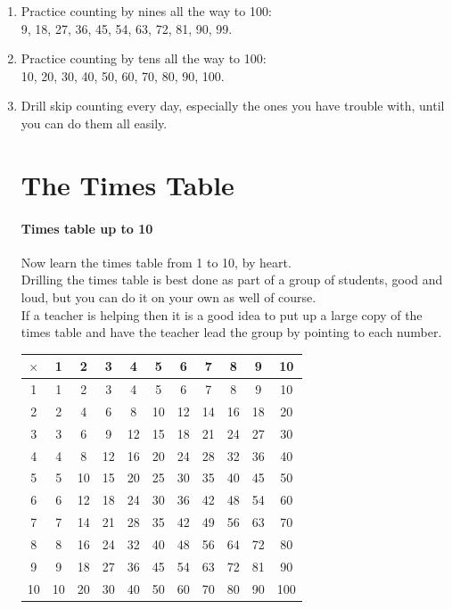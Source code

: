 \documentclass[12pt]{article}
\begin{document}
\begin{enumerate}
\item Practice counting by nines all the way to 100:\\
9, 18, 27, 36, 45, 54, 63, 72, 81, 90, 99.\\

\item Practice counting by tens all the way to 100:\\
10, 20, 30, 40, 50, 60, 70, 80, 90, 100.\\

\item Drill skip counting every day, especially the ones you have trouble with, until you can do them all easily.

\pagebreak

\section*{The Times Table}

\paragraph{Times table up to 10}
Now learn the times table from 1 to 10, by heart.\\

Drilling the times table is best done as part of a group of students, good and loud, but you can do it on your own as well of course.\\

If a teacher is helping then it is a good idea to put up a large copy of the times table and have the teacher lead the group by pointing to each number.\\

\begin{center}
\begin{tabular}{|c||*{10}{c|}}
\hline
$\times$ & 1 & 2 & 3 & 4 & 5 & 6 & 7 & 8 & 9 & 10 \\
\hline\hline
1 & 1 & 2 & 3 & 4 & 5 & 6 & 7 & 8 & 9 & 10 \\
2 & 2 & 4 & 6 & 8 & 10 & 12 & 14 & 16 & 18 & 20 \\
3 & 3 & 6 & 9 & 12 & 15 & 18 & 21 & 24 & 27 & 30 \\
4 & 4 & 8 & 12 & 16 & 20 & 24 & 28 & 32 & 36 & 40 \\
5 & 5 & 10 & 15 & 20 & 25 & 30 & 35 & 40 & 45 & 50 \\
6 & 6 & 12 & 18 & 24 & 30 & 36 & 42 & 48 & 54 & 60 \\
7 & 7 & 14 & 21 & 28 & 35 & 42 & 49 & 56 & 63 & 70 \\
8 & 8 & 16 & 24 & 32 & 40 & 48 & 56 & 64 & 72 & 80 \\
9 & 9 & 18 & 27 & 36 & 45 & 54 & 63 & 72 & 81 & 90 \\
10 & 10 & 20 & 30 & 40 & 50 & 60 & 70 & 80 & 90 & 100 \\
\hline
\end{tabular}
\end{center}


\end{enumerate}
\end{document}
